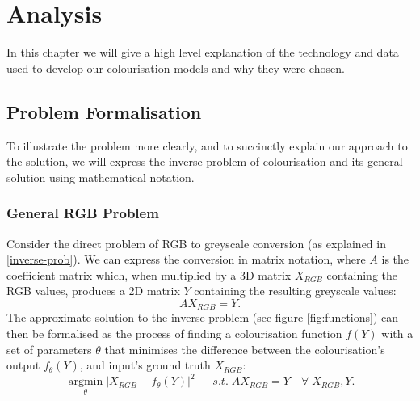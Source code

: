 \documentclass{l4proj}
\begin{document}
\chapter{Analysis}
In this chapter we will give a high level explanation of the technology and data used to develop our colourisation models and why they were chosen. 

\section{Problem Formalisation}
To illustrate the problem more clearly, and to succinctly explain our approach to the solution, we will express the inverse problem of colourisation and its general solution using mathematical notation.

\subsection{General RGB Problem}
Consider the direct problem of RGB to greyscale conversion (as explained in \ref{inverse-prob}). We can express the conversion in matrix notation, where $A$ is the coefficient matrix which, when multiplied by a 3D matrix $X_{RGB}$ containing the RGB values, produces a 2D matrix $Y$ containing the resulting greyscale values:
\begin{equation}
    A X_{RGB} = Y.
\end{equation}
The approximate solution to the inverse problem (see figure \ref{fig:functions}) can then be formalised as the process of finding a colourisation function $f(Y)$ with a set of parameters $\theta$ that minimises the difference between the colourisation's output $f_{\theta}(Y)$, and input's ground truth $X_{RGB}$:
\begin{equation}
    \underset{\theta}{\operatorname{arg min}} |X_{RGB}-f_{\theta}(Y)|^2 \quad\;\; s.t. \; A X_{RGB} = Y \quad \forall \; X_{RGB}, Y.
\end{equation}
\end{document}
